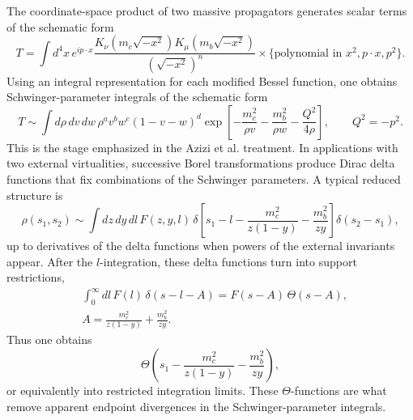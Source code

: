 \documentclass[11pt]{article}
\begin{document}
The coordinate-space product of two massive propagators generates scalar
terms of the schematic form
\begin{equation}
  T
  =
  \int d^4x\,e^{ip\cdot x}
  \frac{
    K_\nu(m_c\sqrt{-x^2})K_\mu(m_b\sqrt{-x^2})
  }{(\sqrt{-x^2})^n}
  \times \{\text{polynomial in }x^2,p\cdot x,p^2\}.
\end{equation}
Using an integral representation for each modified Bessel function, one obtains
Schwinger-parameter integrals of the schematic form
\begin{equation}
  T
  \sim
  \int d\rho\,dv\,dw\,
  \rho^a v^b w^c(1-v-w)^d
  \exp\left[
    -\frac{m_c^2}{\rho v}
    -\frac{m_b^2}{\rho w}
    -\frac{Q^2}{4\rho}
  \right],
  \qquad Q^2=-p^2 .
\end{equation}
This is the stage emphasized in the Azizi et al. treatment.  In applications
with two external virtualities, successive Borel transformations produce
Dirac delta functions that fix combinations of the Schwinger parameters.  A
typical reduced structure is
\begin{equation}
  \rho(s_1,s_2)
  \sim
  \int dz\,dy\,dl\,
  F(z,y,l)\,
  \delta\!\left[
    s_1-l-\frac{m_c^2}{z(1-y)}-\frac{m_b^2}{zy}
  \right]
  \delta(s_2-s_1),
\end{equation}
up to derivatives of the delta functions when powers of the external
invariants appear.  After the \(l\)-integration, these delta functions turn
into support restrictions,
\begin{align}
  &\int_0^\infty dl\,
  F(l)\,
  \delta\!\left(
    s-l-A
  \right)
  =
  F(s-A)\,\Theta(s-A),
  \\
  &A
  =
  \frac{m_c^2}{z(1-y)}
  +
  \frac{m_b^2}{zy}.
\end{align}
Thus one obtains
\begin{equation}
  \Theta\!\left(
    s_1-\frac{m_c^2}{z(1-y)}-\frac{m_b^2}{zy}
  \right),
\end{equation}
or equivalently into restricted integration limits.  These \(\Theta\)-functions
are what remove apparent endpoint divergences in the Schwinger-parameter
integrals.
\end{document}
